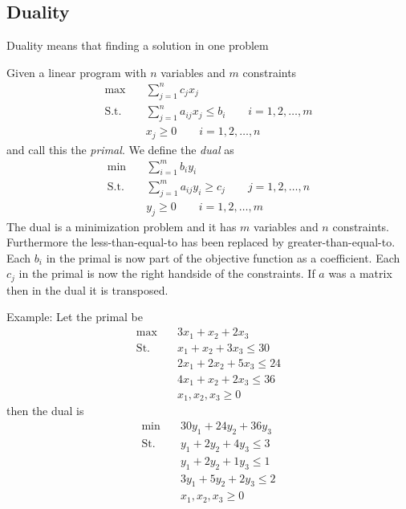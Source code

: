 \documentclass[10pt]{article}
\begin{document}

\subsection{Duality} %
\label{sub:duality}

Duality means that finding a solution in one problem 

Given a linear program with $n$ variables and $m$ constraints
\begin{align}
 \max &\quad \sum_{j=1}^n c_jx_j  \nonumber\\ 
 \text{S.t.} &\quad \sum_{j=1}^n a_{ij}x_j \leq b_i \qquad i=1,2,\ldots,m\label{dual10}\\
             &\quad x_j \geq 0 \qquad i=1,2,\ldots,n \nonumber
\end{align}
and call this the \emph{primal}. We define the \emph{dual} as 
\begin{align}
 \min &\quad \sum_{i=1}^m b_iy_i  \nonumber\\ 
 \text{S.t.} &\quad \sum_{j=1}^m a_{ij}y_i \geq c_j \qquad j=1,2,\ldots,n \label{dual0}\\
             &\quad y_j \geq 0 \qquad i=1,2,\ldots,m \nonumber
\end{align}
The dual is a minimization problem and it has $m$ variables and $n$ constraints. Furthermore the less-than-equal-to has been replaced by greater-than-equal-to. Each $b_i$ in the primal is now part of the objective function as a coefficient. Each $c_j$ in the primal is now the right handside of the constraints. If $a$ was a matrix then in the dual it is transposed. 

Example: Let the primal be
\begin{align}
 \max &\quad 3x_1 + x_2 + 2x_3\label{dual1}\\ 
 \text{St.} &\quad  x_1  + x_2  + 3x_3 \leq 30 \nonumber\\
            &\quad  2x_1 + 2x_2 + 5x_3 \leq 24 \nonumber\\
            &\quad  4x_1 + x_2  + 2x_3 \leq 36 \nonumber\\            
            &\quad  x_1,x_2,x_3 \geq 0  \nonumber
\end{align}
then the dual is
\begin{align}
 \min &\quad 30y_1 + 24y_2 + 36y_3 \label{dual2}\\ 
 \text{St.} &\quad  y_1 + 2y_2  + 4y_3 \leq 3 \nonumber\\
            &\quad  y_1 + 2y_2  + 1y_3 \leq 1 \nonumber\\
            &\quad  3y_1 + 5y_2  + 2y_3 \leq 2 \nonumber\\            
            &\quad  x_1,x_2,x_3 \geq 0  \nonumber
\end{align}
\end{document}
